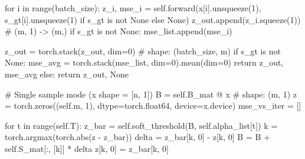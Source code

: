 \documentclass[
  letterpaper,
  DIV=11,
  numbers=noendperiod]{scrartcl}
\newenvironment{Shaded}{\begin{snugshade}}{\end{snugshade}}
\newcommand{\BuiltInTok}[1]{\textcolor[rgb]{0.40,0.85,0.94}{#1}}
\newcommand{\CommentTok}[1]{\textcolor[rgb]{0.46,0.44,0.37}{#1}}
\newcommand{\ControlFlowTok}[1]{\textcolor[rgb]{0.98,0.15,0.45}{#1}}
\newcommand{\DecValTok}[1]{\textcolor[rgb]{0.68,0.51,1.00}{#1}}
\newcommand{\KeywordTok}[1]{\textcolor[rgb]{0.98,0.15,0.45}{#1}}
\newcommand{\NormalTok}[1]{\textcolor[rgb]{0.97,0.97,0.95}{#1}}
\newcommand{\OperatorTok}[1]{\textcolor[rgb]{0.97,0.97,0.95}{#1}}
\newcommand{\VariableTok}[1]{\textcolor[rgb]{0.97,0.97,0.95}{#1}}
\begin{document}
\begin{Shaded}
\begin{Highlighting}[]
            \ControlFlowTok{for}\NormalTok{ i }\KeywordTok{in} \BuiltInTok{range}\NormalTok{(batch\_size):}
\NormalTok{                z\_i, mse\_i }\OperatorTok{=} \VariableTok{self}\NormalTok{.forward(x[i].unsqueeze(}\DecValTok{1}\NormalTok{), s\_gt[i].unsqueeze(}\DecValTok{1}\NormalTok{) }\ControlFlowTok{if}\NormalTok{ s\_gt }\KeywordTok{is} \KeywordTok{not} \VariableTok{None} \ControlFlowTok{else} \VariableTok{None}\NormalTok{)}
\NormalTok{                z\_out.append(z\_i.squeeze(}\DecValTok{1}\NormalTok{))  }\CommentTok{\# (m, 1) {-}\textgreater{} (m,)}
                \ControlFlowTok{if}\NormalTok{ s\_gt }\KeywordTok{is} \KeywordTok{not} \VariableTok{None}\NormalTok{:}
\NormalTok{                    mse\_list.append(mse\_i)}

\NormalTok{            z\_out }\OperatorTok{=}\NormalTok{ torch.stack(z\_out, dim}\OperatorTok{=}\DecValTok{0}\NormalTok{)  }\CommentTok{\# shape: (batch\_size, m)}
            \ControlFlowTok{if}\NormalTok{ s\_gt }\KeywordTok{is} \KeywordTok{not} \VariableTok{None}\NormalTok{:}
\NormalTok{                mse\_avg }\OperatorTok{=}\NormalTok{ torch.stack(mse\_list, dim}\OperatorTok{=}\DecValTok{0}\NormalTok{).mean(dim}\OperatorTok{=}\DecValTok{0}\NormalTok{)}
                \ControlFlowTok{return}\NormalTok{ z\_out, mse\_avg}
            \ControlFlowTok{else}\NormalTok{:}
                \ControlFlowTok{return}\NormalTok{ z\_out, }\VariableTok{None}

    \CommentTok{\# Single sample mode (x shape = [n, 1])}
\NormalTok{        B }\OperatorTok{=} \VariableTok{self}\NormalTok{.B\_mat }\OperatorTok{@}\NormalTok{ x  }\CommentTok{\# shape: (m, 1)}
\NormalTok{        z }\OperatorTok{=}\NormalTok{ torch.zeros((}\VariableTok{self}\NormalTok{.m, }\DecValTok{1}\NormalTok{), dtype}\OperatorTok{=}\NormalTok{torch.float64, device}\OperatorTok{=}\NormalTok{x.device)}
\NormalTok{        mse\_vs\_iter }\OperatorTok{=}\NormalTok{ []}

        \ControlFlowTok{for}\NormalTok{ t }\KeywordTok{in} \BuiltInTok{range}\NormalTok{(}\VariableTok{self}\NormalTok{.T):}
\NormalTok{            z\_bar }\OperatorTok{=} \VariableTok{self}\NormalTok{.soft\_threshold(B, }\VariableTok{self}\NormalTok{.alpha\_list[t])}
\NormalTok{            k }\OperatorTok{=}\NormalTok{ torch.argmax(torch.}\BuiltInTok{abs}\NormalTok{(z }\OperatorTok{{-}}\NormalTok{ z\_bar))}
\NormalTok{            delta }\OperatorTok{=}\NormalTok{ z\_bar[k, }\DecValTok{0}\NormalTok{] }\OperatorTok{{-}}\NormalTok{ z[k, }\DecValTok{0}\NormalTok{]}
\NormalTok{            B }\OperatorTok{=}\NormalTok{ B }\OperatorTok{+} \VariableTok{self}\NormalTok{.S\_mat[:, [k]] }\OperatorTok{*}\NormalTok{ delta}
\NormalTok{            z[k, }\DecValTok{0}\NormalTok{] }\OperatorTok{=}\NormalTok{ z\_bar[k, }\DecValTok{0}\NormalTok{]}


\end{Highlighting}
\end{Shaded}
\end{document}
